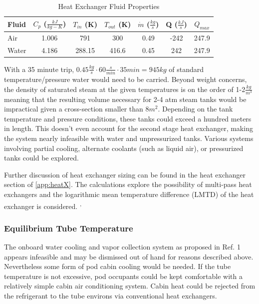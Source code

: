 \documentclass[heading.tex]{subfiles}
\begin{document}

\begin{table}
    \centering
    \caption{Heat Exchanger Fluid Properties}
    \label{tab:HeatEx}
    \begin{tabular}{l  c  c  c  c  c  c} 
        \hline
        Fluid & $C_{p}$ ($\frac{kJ}{kg-K}$)& $T_{in}$ (K) & $T_{out}$ (K) & $\dot{m}$ ($\frac{kg}{s}$) & Q ($\frac{kJ}{s}$) & $Q_{max}$\\ \hline 
        Air & 1.006 & 791 & 300 & 0.49 & -242 & 247.9\\ 
        Water & 4.186 & 288.15 & 416.6 &0.45 & 242 & 247.9\\ \hline
    \end{tabular}
\end{table}

With a 35 minute trip, $0.45 \frac{kg}{s} \cdot 60 \frac{s}{min} \cdot 35min = 945 kg$
of standard temperature/pressure water would need to be carried.
Beyond weight concerns, the density of saturated steam at the given temperatures is on the order of 1-2$\frac{kg}{m^{3}}$
meaning that the resulting volume necessary for 2-4 atm
steam tanks would be impractical given a cross-section smaller than 8$m^{2}$.
Depending on the tank temperature and pressure conditions, these tanks could exceed a hundred meters in length.
This doesn't even account for the second stage heat exchanger,
making the system nearly infeasible with water and unpressurized tanks.
Various systems involving partial cooling, alternate coolants (such as liquid air), or pressurized tanks could be explored.

Further discussion of heat exchanger sizing can be found in the heat exchanger section of \cref{app:heatX}.
The calculations explore the possibility of multi-pass heat exchangers
and the logarithmic mean temperature difference (LMTD) of the heat exchanger is considered.
\cite{Cengal}\textsuperscript{,}
\cite{Turns}


\subsubsection{Equilibrium Tube Temperature}

The onboard water cooling and vapor collection system as proposed in Ref. 1
appears infeasible and may be dismissed out of hand for reasons described above.
Nevertheless some form of pod cabin cooling would be needed. 
If the tube temperature is not excessive,
pod occupants could be kept comfortable with a relatively simple cabin air conditioning system.
Cabin heat could be rejected from the refrigerant to the tube environs via conventional heat
exchangers.
\end{document}
